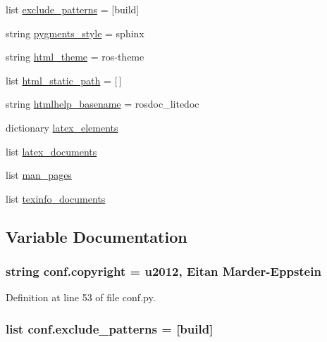\begin{DoxyCompactItemize}
\item 
list \hyperlink{namespaceconf_a7ad48fb6f3e9b129c02346ea0d3527c1}{exclude\+\_\+patterns} = \mbox{[}\textquotesingle{}build\textquotesingle{}\mbox{]}
\item 
string \hyperlink{namespaceconf_a641130e096b26cba8a5d63ed38684de7}{pygments\+\_\+style} = \textquotesingle{}sphinx\textquotesingle{}
\item 
string \hyperlink{namespaceconf_a6c3bfcc1a44546c1c75ce20f55bd0fd6}{html\+\_\+theme} = \textquotesingle{}ros-\/theme\textquotesingle{}
\item 
list \hyperlink{namespaceconf_af4fb5d8851ccaade135c2668dd3ced41}{html\+\_\+static\+\_\+path} = \mbox{[}$\,$\mbox{]}
\item 
string \hyperlink{namespaceconf_aab7fddb2766ce3c430d8246fbfdbc7b1}{htmlhelp\+\_\+basename} = \textquotesingle{}rosdoc\+\_\+litedoc\textquotesingle{}
\item 
dictionary \hyperlink{namespaceconf_a33619d385ad23765ac6ebb58bf82d43d}{latex\+\_\+elements}
\item 
list \hyperlink{namespaceconf_a7812f49970f3de0d15dd7b9b9a10e3a1}{latex\+\_\+documents}
\item 
list \hyperlink{namespaceconf_a85efc5fee48a26fa2d651f6eeb38fc2b}{man\+\_\+pages}
\item 
list \hyperlink{namespaceconf_a54b0faed214ac92017d5689efbb10672}{texinfo\+\_\+documents}
\end{DoxyCompactItemize}


\subsection{Variable Documentation}
\subsubsection[{\texorpdfstring{copyright}{copyright}}]{\setlength{\rightskip}{0pt plus 5cm}string conf.\+copyright = u\textquotesingle{}2012, Eitan Marder-\/Eppstein\textquotesingle{}}\hypertarget{namespaceconf_a33fa97cf51dcb25970fbf53f10159589}{}\label{namespaceconf_a33fa97cf51dcb25970fbf53f10159589}


Definition at line 53 of file conf.\+py.

\subsubsection[{\texorpdfstring{exclude\+\_\+patterns}{exclude_patterns}}]{\setlength{\rightskip}{0pt plus 5cm}list conf.\+exclude\+\_\+patterns = \mbox{[}\textquotesingle{}build\textquotesingle{}\mbox{]}}\hypertarget{namespaceconf_a7ad48fb6f3e9b129c02346ea0d3527c1}{}\label{namespaceconf_a7ad48fb6f3e9b129c02346ea0d3527c1}


